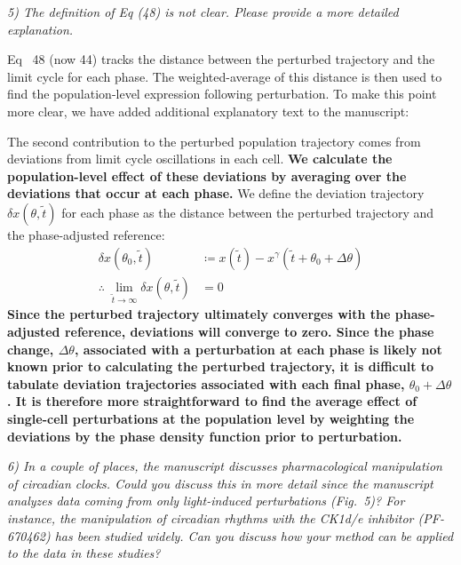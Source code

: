 \documentclass[11pt, letterpaper]{article}
\newenvironment{reviewer}{\itshape\color{gray}}{}
\newenvironment{manuscript}[1]{\begin{center}\begin{tcolorbox}[colback=green!5!white,colframe=green!75!black,width=0.8\textwidth,title={#1},breakable,fonttitle=\bfseries]}{\end{tcolorbox}\end{center}}
\begin{document}
\begin{reviewer}
5) The definition of Eq (48) is not clear.
Please provide a more detailed explanation.
\end{reviewer}

Eq~ 48 (now 44) tracks the distance between the perturbed trajectory and the limit cycle for each phase.
The weighted-average of this distance is then used to find the population-level expression following perturbation.
To make this point more clear, we have added additional explanatory text to the manuscript:

\begin{manuscript}{Pages 12-13}
The second contribution to the perturbed population trajectory comes from deviations from limit cycle oscillations in each cell.
{\bfseries We calculate the population-level effect of these deviations by averaging over the deviations that occur at each phase.}
We define the deviation trajectory $\delta x(\theta, \tilde{t})$ for each phase as the distance between the perturbed trajectory and the phase-adjusted reference:
\begin{align}
  \delta x(\theta_0, \tilde{t}) &\coloneqq x(\tilde{t}) - x^\gamma(\tilde{t} + \theta_0 + \Delta \theta)\tag{48} \\
  \therefore\; \lim_{\tilde{t} \to \infty} \delta x(\theta, \tilde{t}) &= 0 \tag{49}
\end{align}
{\bfseries Since the perturbed trajectory ultimately converges with the phase-adjusted reference, deviations will converge to zero.
Since the phase change, $\Delta\theta$, associated with a perturbation at each phase is likely not known prior to calculating the perturbed trajectory, it is difficult to tabulate deviation trajectories associated with each final phase, $\theta_0 + \Delta\theta$.
It is therefore more straightforward to find the average effect of single-cell perturbations at the population level by weighting the deviations by the phase density function prior to perturbation.}
\end{manuscript}

\begin{reviewer}
6) In a couple of places, the manuscript discusses pharmacological manipulation of circadian clocks.
Could you discuss this in more detail since the manuscript analyzes data coming from only light-induced perturbations (Fig.~5)? 
For instance, the manipulation of circadian rhythms with the CK1d/e inhibitor (PF-670462) has been studied widely.
Can you discuss how your method can be applied to the data in these studies?
\end{reviewer}
\end{document}
